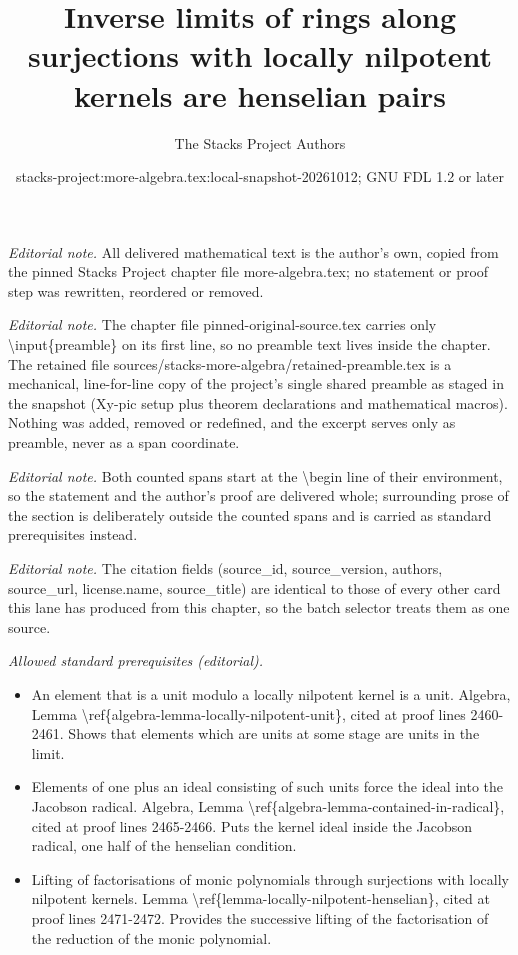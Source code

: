 \documentclass[10pt,a4paper]{amsart}
\title{Inverse limits of rings along surjections with locally nilpotent kernels are henselian pairs}
\author{The Stacks Project Authors}
\date{stacks-project:more-algebra.tex:local-snapshot-20261012; GNU FDL 1.2 or later}
\theoremstyle{plain}
\theoremstyle{definition}
\theoremstyle{remark}
\numberwithin{equation}{subsection}
\begin{document}
\maketitle
\setcounter{subsection}{1}
\noindent\textit{Editorial note.} All delivered mathematical text is the author's own, copied from the pinned Stacks Project chapter file more-algebra.tex; no statement or proof step was rewritten, reordered or removed.\par\medskip
\noindent\textit{Editorial note.} The chapter file pinned-original-source.tex carries only \textbackslash{}input\{preamble\} on its first line, so no preamble text lives inside the chapter. The retained file sources/stacks-more-algebra/retained-preamble.tex is a mechanical, line-for-line copy of the project's single shared preamble as staged in the snapshot (Xy-pic setup plus theorem declarations and mathematical macros). Nothing was added, removed or redefined, and the excerpt serves only as preamble, never as a span coordinate.\par\medskip
\noindent\textit{Editorial note.} Both counted spans start at the \textbackslash{}begin line of their environment, so the statement and the author's proof are delivered whole; surrounding prose of the section is deliberately outside the counted spans and is carried as standard prerequisites instead.\par\medskip
\noindent\textit{Editorial note.} The citation fields (source\_id, source\_version, authors, source\_url, license.name, source\_title) are identical to those of every other card this lane has produced from this chapter, so the batch selector treats them as one source.\par\medskip
\noindent\textit{Allowed standard prerequisites (editorial).}\begin{itemize}
\item An element that is a unit modulo a locally nilpotent kernel is a unit. Algebra, Lemma \textbackslash{}ref\{algebra-lemma-locally-nilpotent-unit\}, cited at proof lines 2460-2461. Shows that elements which are units at some stage are units in the limit.
\item Elements of one plus an ideal consisting of such units force the ideal into the Jacobson radical. Algebra, Lemma \textbackslash{}ref\{algebra-lemma-contained-in-radical\}, cited at proof lines 2465-2466. Puts the kernel ideal inside the Jacobson radical, one half of the henselian condition.
\item Lifting of factorisations of monic polynomials through surjections with locally nilpotent kernels. Lemma \textbackslash{}ref\{lemma-locally-nilpotent-henselian\}, cited at proof lines 2471-2472. Provides the successive lifting of the factorisation of the reduction of the monic polynomial.
\end{itemize}\medskip
\end{document}
